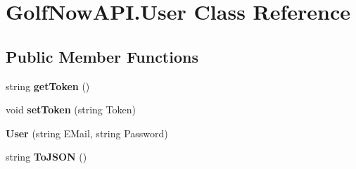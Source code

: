 \hypertarget{class_golf_now_a_p_i_1_1_user}{}\section{Golf\+Now\+A\+P\+I.\+User Class Reference}
\label{class_golf_now_a_p_i_1_1_user}
\subsection*{Public Member Functions}
\begin{DoxyCompactItemize}
\item 
\mbox{\label{class_golf_now_a_p_i_1_1_user_a9613eb4736c5fa5ae42d39463c96fd40}} 
string {\bfseries get\+Token} ()
\item 
\mbox{\label{class_golf_now_a_p_i_1_1_user_a9d711aff690c9e9270d4d9fd70af759c}} 
void {\bfseries set\+Token} (string Token)
\item 
\mbox{\label{class_golf_now_a_p_i_1_1_user_a3a4cac2033e314b8c38e26b8f3bf7781}} 
{\bfseries User} (string E\+Mail, string Password)
\item 
\mbox{\label{class_golf_now_a_p_i_1_1_user_a2e33a3d577e16ab20f017a26bf4baa2d}} 
string {\bfseries To\+J\+S\+ON} ()
\end{DoxyCompactItemize}
